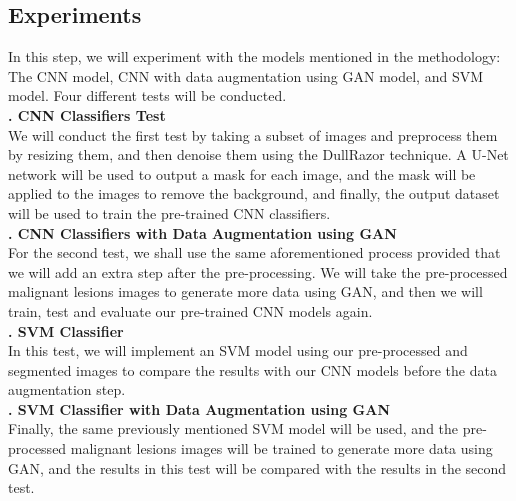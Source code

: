 \documentclass[12pt]{diazessay}
\newcommand{\RomanNumeralCaps}[1]
{\MakeUppercase{\romannumeral #1}}
\begin{document}
    \subsection{Experiments}
    \hspace{0.7cm} In this step, we will experiment with the models mentioned in the methodology: The CNN model, CNN with data augmentation using GAN model, and SVM model. Four different tests will be conducted. \\
        \textbf{\RomanNumeralCaps { 1. } CNN Classifiers Test} \\
        \-\hspace{0.7cm} We will conduct the first test by taking a subset of images and preprocess them by resizing them, and then denoise them using the DullRazor technique. A U-Net network will be used to output a mask for each image, and the mask will be applied to the images to remove the background, and finally, the output dataset will be used to train the pre-trained CNN classifiers. %
        \\
        \textbf{\RomanNumeralCaps { 2. } CNN Classifiers with Data Augmentation using GAN}\\
        \-\hspace{0.7cm} For the second test, we shall use the same aforementioned process provided that we will add an extra step after the pre-processing. We will take the pre-processed malignant lesions images to generate more data using GAN, and then we will train, test and evaluate our pre-trained CNN models again.
        \\ 
        \textbf{\RomanNumeralCaps { 3. } SVM Classifier}\\ 
        \-\hspace{0.7cm}  In this test, we will implement an SVM model using our pre-processed and segmented images to compare the results with our CNN models before the data augmentation step.
        \\
        \textbf{\RomanNumeralCaps { 4. } SVM Classifier with Data Augmentation using GAN}\\
        \-\hspace{0.7cm} Finally, the same previously mentioned SVM model will be used, and the pre-processed malignant lesions images will be trained to generate more data using GAN, and the results in this test will be compared with the results in the second test.
\end{document}
